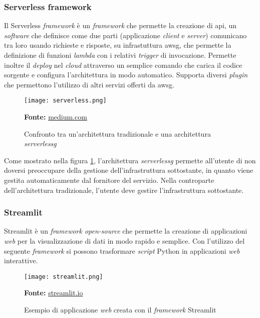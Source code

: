 \subsubsection{Serverless framework}
Il Serverless \textit{framework} è un \textit{framework} che permette la creazione di \gls{api}, un \textit{software} che definisce come due parti (applicazione \textit{client} e \textit{server}) comunicano tra loro usando richieste e risposte, su infrastuttura \gls{awsg}, che permette la definizione di funzioni \textit{lambda} con i relativi \textit{trigger} di invocazione.
Permette inoltre il \textit{deploy} nel \textit{cloud} attraverso un semplice comando che carica il codice sorgente e configura l'architettura in modo automatico. Supporta diversi \textit{plugin} che permettono l'utilizzo di altri servizi offerti da \gls{awsg}.
\begin{figure}[H]
    \centering
    \texttt{[image: serverless.png]}
    \caption{Confronto tra un'architettura tradizionale e una architettura \textit{\gls{serverlessg}}}
    \small \textbf{Fonte:} \href{https://medium.com/canonichq/server-v-s-serverless-architecture-bf3cdab28174}{medium.com}
    \label{fig:Serverless}
\end{figure} 
\noindent
Come mostrato nella figura \ref{fig:Serverless}, l'architettura \textit{\gls{serverlessg}} permette all'utente di non doversi preoccupare della gestione dell'infrastruttura sottostante, in quanto viene gestita automaticamente dal fornitore del servizio. Nella controparte dell'architettura tradizionale, l'utente deve gestire l'infrastruttura sottostante.
\subsubsection{Streamlit}
Streamlit è un \textit{framework open-source} che permette la creazione di applicazioni \textit{web} per la visualizzazione di dati in modo rapido e semplice.
Con l'utilizzo del seguente \textit{framework} si possono trasformare \textit{script} Python in applicazioni \textit{web} interattive.
\begin{figure}[H]
    \centering
    \texttt{[image: streamlit.png]}
    \caption{Esempio di applicazione \textit{web} creata con il \textit{framework} Streamlit}
    \small \textbf{Fonte:} \href{https://streamlit.io}{streamlit.io}
    \label{fig:Streamlit}
\end{figure} 

